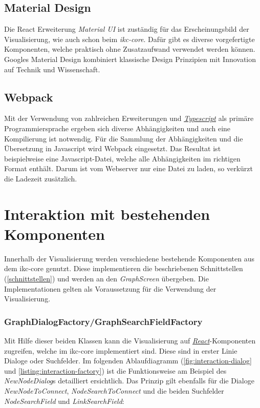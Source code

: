 \subsection{Material Design}

Die React Erweiterung \textit{Material UI} ist zuständig für das Erscheinungsbild der Visualisierung, wie auch schon beim \textit{ikc-core}. Dafür gibt es diverse vorgefertigte Komponenten, welche praktisch ohne Zusatzaufwand verwendet werden können. Googles Material Design kombiniert klassische Design Prinzipien mit Innovation auf Technik und Wissenschaft. \citep{react-material-ui, google-material-ui}

\subsection{Webpack}

Mit der Verwendung von zahlreichen Erweiterungen und \hyperref[typescript]{\textit{Typescript}} als primäre Programmiersprache ergeben sich diverse Abhängigkeiten und auch eine Kompilierung ist notwendig. Für die Sammlung der Abhängigkeiten und die Übersetzung in Javascript wird Webpack eingesetzt. Das Resultat ist beispielweise eine Javascript-Datei, welche alle Abhängigkeiten im richtigen Format enthält. Darum ist vom Webserver nur eine Datei zu laden, so verkürzt die Ladezeit zusätzlich. \citep{webpack}

\section[Interkation]{Interaktion mit bestehenden Komponenten}\label{interaktion}

Innerhalb der Visualisierung werden verschiedene bestehende Komponenten aus dem \gls{ikc-core} genutzt. Diese implementieren die beschriebenen Schnittstellen (\autoref{schnittstellen}) und werden an den \textit{GraphScreen} üb\-er\-ge\-ben. Die Implementationen gelten als Voraussetzung für die Verwendung der Visualisierung.

\subsubsection{GraphDialogFactory/GraphSearchFieldFactory}
Mit Hilfe dieser beiden Klassen kann die Visualisierung auf \hyperref[react]{\textit{React}}-Komponenten zugreifen, welche im \gls{ikc-core} implementiert sind. Diese sind in erster Linie Dialoge oder Suchfelder. Im folgenden Ablaufdiagramm (\autoref{fig:interaction-dialog} und \autoref{listing:interaction-factory}) ist die Funktionsweise am Beispiel des \textit{NewNodeDialog}s detailliert ersichtlich. Das Prinzip gilt ebenfalls für die Dialoge \textit{NewNodeToConnect}, \textit{NodeSearchToConnect} und die beiden Suchfelder \textit{NodeSearchField} und \textit{LinkSearchField}:

